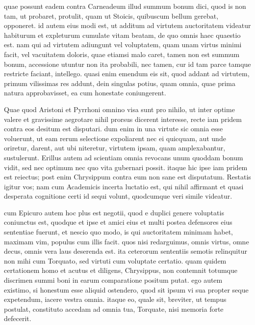  quae possunt eadem contra Carneadeum illud summum bonum dici, quod is non tam, ut probaret, protulit, quam ut Stoicis, quibuscum bellum gerebat, opponeret. id autem eius modi est, ut additum ad virtutem auctoritatem videatur habiturum et expleturum cumulate vitam beatam, de quo omnis haec quaestio est. nam qui ad virtutem adiungunt vel voluptatem, quam unam virtus minimi facit, vel vacuitatem doloris, quae etiamsi malo caret, tamen non est summum bonum, accessione utuntur non ita probabili, nec tamen, cur id tam parce tamque restricte faciant, intellego. quasi enim emendum eis sit, quod addant ad virtutem, primum vilissimas res addunt, dein singulas potius, quam omnia, quae prima natura approbavisset, ea cum honestate coniungerent.

 Quae quod Aristoni et Pyrrhoni omnino visa sunt pro nihilo, ut inter optime valere et gravissime aegrotare nihil prorsus dicerent interesse, recte iam pridem contra eos desitum est disputari. dum enim in una virtute sic omnia esse voluerunt, ut eam rerum selectione expoliarent nec ei quicquam, aut unde oriretur, darent, aut ubi niteretur, virtutem ipsam, quam amplexabantur, sustulerunt. Erillus autem ad scientiam omnia revocans unum quoddam bonum vidit, sed nec optimum nec quo vita gubernari possit. itaque hic ipse iam pridem est reiectus; post enim Chrysippum contra eum non sane est disputatum. Restatis igitur vos; nam cum Academicis incerta luctatio est, qui nihil affirmant et quasi desperata cognitione certi id sequi volunt, quodcumque veri simile videatur.

 cum Epicuro autem hoc plus est negotii, quod e duplici genere voluptatis coniunctus est, quodque et ipse et amici eius et multi postea defensores eius sententiae fuerunt, et nescio quo modo, is qui auctoritatem minimam habet, maximam vim, populus cum illis facit. quos nisi redarguimus, omnis virtus, omne decus, omnis vera laus deserenda est. ita ceterorum sententiis semotis relinquitur non mihi cum Torquato, sed virtuti cum voluptate certatio. quam quidem certationem homo et acutus et diligens, Chrysippus, non contemnit totumque discrimen summi boni in earum comparatione positum putat. ego autem existimo, si honestum esse aliquid ostendero, quod sit ipsum vi sua propter seque expetendum, iacere vestra omnia. itaque eo, quale sit, breviter, ut tempus postulat, constituto accedam ad omnia tua, Torquate, nisi memoria forte defecerit.

